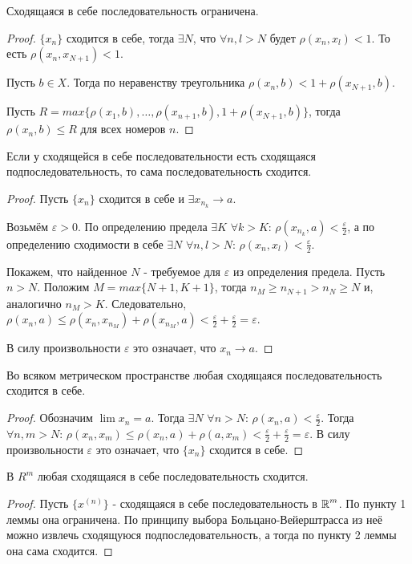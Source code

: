 \begin{lemma}
Сходящаяся в себе последовательность ограничена. 
\end{lemma}
\begin{proof}
$\{x_n\}$ сходится в себе, тогда $\exists N$, что $\forall n, l > N$ будет $\rho(x_n, x_l) < 1$. То есть $\rho(x_n, x_{N+1}) < 1$. 
  
Пусть $b \in X$. Тогда по неравенству треугольника $\rho(x_n, b) < 1 + \rho(x_{N+1}, b)$. 
  
Пусть $R = max\{\rho(x_1, b), \ldots, \rho(x_{n+1}, b), 1 + \rho(x_{N+1}, b)\}$, тогда $\rho(x_n, b) \leq R$ для всех номеров $n$.
\end{proof}
\begin{lemma} Если у сходящейся в себе последовательности есть сходящаяся подпоследовательность, то сама последовательность сходится.
\end{lemma}
\begin{proof}
Пусть $\{x_n\}$ сходится в себе и $\exists x_{n_k} \rightarrow a$. 
  
Возьмём $\varepsilon > 0$. По определению предела $\exists K$ $\forall k > K$: $\rho(x_{n_k}, a) < \frac{\varepsilon}{2}$, а по определению сходимости в себе $\exists N$ $\forall n, l > N$: $\rho(x_n, x_l) < \frac{\varepsilon}{2}$. 
  
Покажем, что найденное $N$ - требуемое для $\varepsilon$ из определения предела. Пусть $n > N$. Положим $M = max\{N + 1, K + 1\}$, тогда 
$n_M \geq n_{N+1} > n_N \geq N$ и, аналогично $n_M > K$. Следовательно, $\rho(x_n, a) \leq \rho(x_n, x_{n_M}) + \rho(x_{n_M}, a) < \frac{\varepsilon}{2} + \frac{\varepsilon}{2} = \varepsilon$. 
  
В силу произвольности $\varepsilon$ это означает, что $x_n \rightarrow a$.
\end{proof}

\begin{theorem}Во всяком метрическом пространстве любая сходящаяся последовательность сходится в себе.
\end{theorem}

\begin{proof}
Обозначим $\lim x_n = a$. Тогда $\exists N$ $\forall n > N$: $\rho(x_n, a) < \frac{\varepsilon}{2}$. Тогда $\forall n, m > N$: $\rho(x_n, x_m) \leq \rho(x_n, a) + \rho(a, x_m) < \frac{\varepsilon}{2} + \frac{\varepsilon}{2} = \varepsilon$. В силу произвольности $\varepsilon$ это означает, что $\{x_n\}$ сходится в себе.
\end{proof}

\begin{theorem}В $R^m$ любая сходящаяся в себе последовательность сходится.
\end{theorem}
\begin{proof}
Пусть $\{x^{(n)}\}$ - сходящаяся в себе последовательность в $\operatorname*{\mathbb{R}}^m$. По пункту 1 леммы она ограничена. По принципу выбора Больцано-Вейерштрасса из неё можно извлечь сходящуюся подпоследовательность, а тогда по пункту 2 леммы она сама сходится.
\end{proof}
